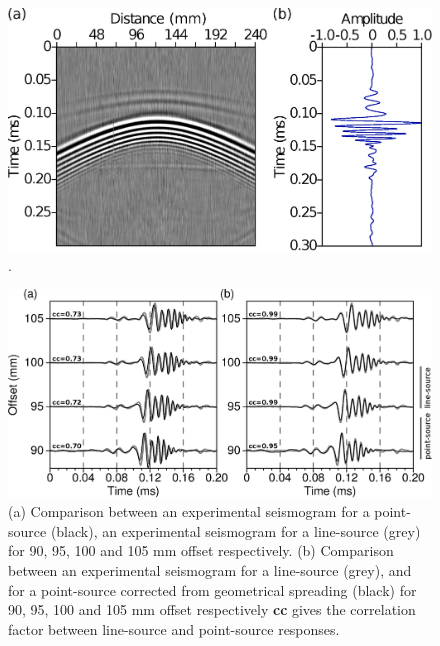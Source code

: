 \documentclass[manuscript,revised]{geophysics}
\begin{document}
\begin{figure}[!h]
	\centering
	\includegraphics[scale=0.4]{fig/amplitude_stack_principle.eps}
	\caption{.}
	\label{amplitude_stack_principle}
\end{figure}

\begin{figure}[!h]
	\centering
	\includegraphics[scale=0.5]{fig/bialt_2d3d_merge.eps}
	\caption{(a) Comparison between an experimental seismogram for a point-source (black), an experimental seismogram for a line-source (grey) for 90, 95, 100 and 105 mm offset respectively. (b) Comparison between an experimental seismogram for a line-source (grey), and for a point-source corrected from geometrical spreading (black) for 90, 95, 100 and 105 mm offset respectively \textbf{cc} gives the correlation factor between line-source and point-source responses.}
	\label{panel_amplitude}
\end{figure}
\end{document}
